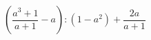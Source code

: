 \begin{ex}[type=expression]
	\begin{condition}
		\(\left( \dfrac{a^3+1}{a+1}-a \right):(1-a^2)+\dfrac{2a}{a+1}\)
	\end{condition}
\end{ex}